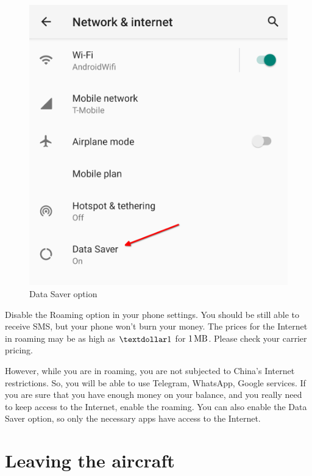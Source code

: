\begin{figure}[H]
\begin{minipage}{0.45\textwidth}
		\includegraphics[width=\linewidth]{02_china/images/01_data_saver}
		\caption{Data Saver option}
	\end{minipage}
	\label{fig:cn_disable_roaming}
\end{figure}

Disable the Roaming option in your phone settings.
You should be still able to receive SMS, but your phone won't burn your money.
The prices for the Internet in roaming may be as high as $\textdollar1$ for $\SI{1}{\mega\byte}$.
Please check your carrier pricing.

However, while you are in roaming, you are not subjected to China's Internet restrictions.
So, you will be able to use Telegram, WhatsApp, Google services.
If you are sure that you have enough money on your balance, and you really need to keep access to the Internet, enable the roaming.
You can also enable the Data Saver option, so only the necessary apps have access to the Internet.

\section[Leaving the aircraft]{Leaving the aircraft}\label{sec:cn_leaving_the_aircraft}